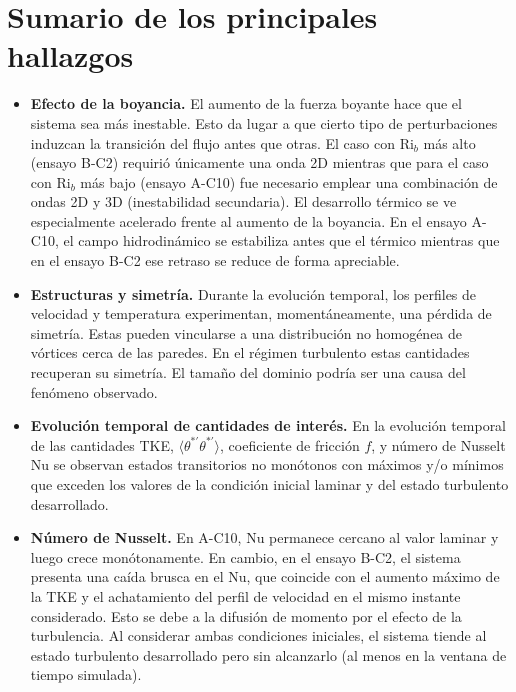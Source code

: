 \newpage

\section{Sumario de los principales hallazgos}

\begin{itemize}
  
  \item \textbf{Efecto de la boyancia.} El aumento de la fuerza boyante hace que el sistema sea más inestable. Esto da lugar a que cierto tipo de perturbaciones induzcan la transición del flujo antes que otras. El caso con Ri$_b$ más alto (ensayo B-C2) requirió únicamente una onda 2D mientras que para el caso con Ri$_b$ más bajo (ensayo A-C10) fue necesario emplear una combinación de ondas 2D y 3D (inestabilidad secundaria). El desarrollo térmico se ve especialmente acelerado frente al aumento de la boyancia. En el ensayo A-C10, el campo hidrodinámico se estabiliza antes que el térmico mientras que en el ensayo B-C2 ese retraso se reduce de forma apreciable.
  
 \item \textbf{Estructuras y simetría.} Durante la evolución temporal, los perfiles de velocidad y temperatura experimentan, momentáneamente, una pérdida de simetría. Estas pueden vincularse a una distribución no homogénea de vórtices cerca de las paredes. En el \linebreak régimen turbulento estas cantidades recuperan su simetría. El tamaño del dominio podría ser una causa del fenómeno observado.  
  
  \item \textbf{Evolución temporal de cantidades de interés.} En la evolución temporal de las cantidades TKE, $\langle \theta^{* \prime} \theta^{* \prime} \rangle$, coeficiente de fricción $f$, y número de Nusselt Nu se observan estados transitorios no monótonos con máximos y/o mínimos que exceden los valores de la condición inicial laminar y del estado turbulento desarrollado.
  
  \item \textbf{Número de Nusselt.} En A-C10, Nu permanece cercano al valor laminar y luego crece monótonamente. En cambio, en el ensayo B-C2, el sistema presenta una caída brusca en el Nu, que coincide con el aumento máximo de la TKE y el achatamiento del perfil de velocidad en el mismo instante considerado. Esto se debe a la difusión de momento por el efecto de la turbulencia. Al considerar ambas condiciones iniciales, el sistema tiende al estado turbulento desarrollado pero sin alcanzarlo (al menos en la ventana de tiempo simulada).
    

\end{itemize}
